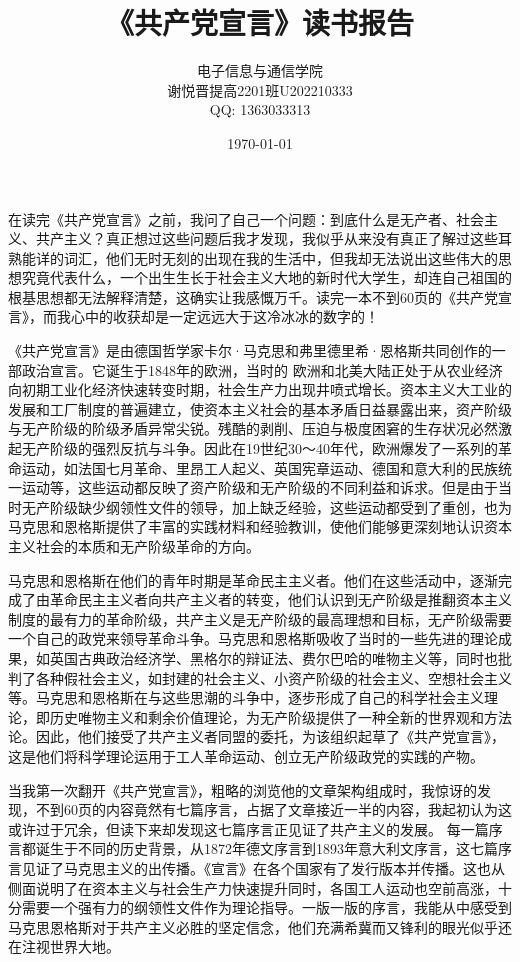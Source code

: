\documentclass[a4paper,11pt,UTF8]{article}
\title{《共产党宣言》读书报告}
\author{电子信息与通信学院\\谢悦晋\quad 提高2201班\quad U202210333\\QQ: 1363033313}
\date{\today}
\begin{document}
	\maketitle

在读完《共产党宣言》之前，我问了自己一个问题：到底什么是无产者、社会主义、共产主义？真正想过这些问题后我才发现，我似乎从来没有真正了解过这些耳熟能详的词汇，他们无时无刻的出现在我的生活中，但我却无法说出这些伟大的思想究竟代表什么，一个出生生长于社会主义大地的新时代大学生，却连自己祖国的根基思想都无法解释清楚，这确实让我感慨万千。读完一本不到60页的《共产党宣言》，而我心中的收获却是一定远远大于这冷冰冰的数字的！

《共产党宣言》是由德国哲学家卡尔·马克思和弗里德里希·恩格斯共同创作的一部政治宣言。它诞生于1848年的欧洲，当时的
欧洲和北美大陆正处于从农业经济向初期工业化经济快速转变时期，社会生产力出现井喷式增长。资本主义大工业的发展和工厂制度的普遍建立，使资本主义社会的基本矛盾日益暴露出来，资产阶级与无产阶级的阶级矛盾异常尖锐。残酷的剥削、压迫与极度困窘的生存状况必然激起无产阶级的强烈反抗与斗争。因此在19世纪30～40年代，欧洲爆发了一系列的革命运动，如法国七月革命、里昂工人起义、英国宪章运动、德国和意大利的民族统一运动等，这些运动都反映了资产阶级和无产阶级的不同利益和诉求。但是由于当时无产阶级缺少纲领性文件的领导，加上缺乏经验，这些运动都受到了重创，也为马克思和恩格斯提供了丰富的实践材料和经验教训，使他们能够更深刻地认识资本主义社会的本质和无产阶级革命的方向。

马克思和恩格斯在他们的青年时期是革命民主主义者。他们在这些活动中，逐渐完成了由革命民主主义者向共产主义者的转变，他们认识到无产阶级是推翻资本主义制度的最有力的革命阶级，共产主义是无产阶级的最高理想和目标，无产阶级需要一个自己的政党来领导革命斗争。马克思和恩格斯吸收了当时的一些先进的理论成果，如英国古典政治经济学、黑格尔的辩证法、费尔巴哈的唯物主义等，同时也批判了各种假社会主义，如封建的社会主义、小资产阶级的社会主义、空想社会主义等。马克思和恩格斯在与这些思潮的斗争中，逐步形成了自己的科学社会主义理论，即历史唯物主义和剩余价值理论，为无产阶级提供了一种全新的世界观和方法论。因此，他们接受了共产主义者同盟的委托，为该组织起草了《共产党宣言》，这是他们将科学理论运用于工人革命运动、创立无产阶级政党的实践的产物。

当我第一次翻开《共产党宣言》，粗略的浏览他的文章架构组成时，我惊讶的发现，不到60页的内容竟然有七篇序言，占据了文章接近一半的内容，我起初认为这或许过于冗余，但读下来却发现这七篇序言正见证了共产主义的发展。 每一篇序言都诞生于不同的历史背景，从1872年德文序言到1893年意大利文序言，这七篇序言见证了马克思主义的出传播。《宣言》在各个国家有了发行版本并传播。这也从侧面说明了在资本主义与社会生产力快速提升同时，各国工人运动也空前高涨，十分需要一个强有力的纲领性文件作为理论指导。一版一版的序言，我能从中感受到马克思恩格斯对于共产主义必胜的坚定信念，他们充满希冀而又锋利的眼光似乎还在注视世界大地。
\end{document}
